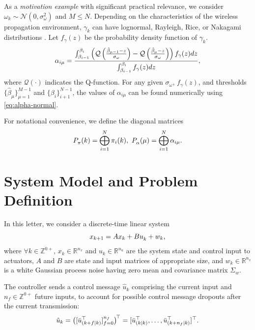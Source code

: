\documentclass[journal,twoside,web]{ieeecolor}
\begin{document}
As a \emph{motivation example} with significant practical relevance, we consider $\omega_k \sim \mathcal{N}(0,\sigma_{\omega}^2)$ and $M\leq N$. 
Depending on the characteristics of the wireless propagation environment, $\gamma_k$ can have lognormal, Rayleigh, Rice, or Nakagami distributions \cite{stuber2017principles}. 
Let $f_{\gamma}(z)$ be the probability density function of $\gamma_k$.
\begin{equation}\label{eq:alpha-normal}
    \text{\small $\alpha_{i\mu} = \frac{
    \int_{\beta_{i-1}}^{\beta_{i}}\left(
    \mathcal{Q}\left(\frac{\hat{\beta}_{\mu-1}-z}{\sigma_{\omega}}\right) - 
    \mathcal{Q}\left(\frac{\hat{\beta}_{\mu}-z}{\sigma_{\omega}}\right) 
    \right) f_{\gamma}(z)dz}{
    \int_{\beta_{i-1}}^{\beta_{i}} f_{\gamma}(z)dz},$}
\end{equation}
where $\mathcal{Q}(\cdot)$ indicates the Q-function. For any given $\sigma_{\omega}$, $f_{\gamma}(z)$, and %
thresholds $\{\hat{\beta}_{\mu}\}_{\mu=1}^{M-1}$ and $\{\beta_{i}\}_{i+1}^{N-1}$, the values of $\alpha_{i\mu}$ can be found numerically using \eqref{eq:alpha-normal}.

For notational convenience, we define the diagonal matrices
\begin{equation}\label{eq:diag-prob}
     \text{\small $P_{\pi}^{}(k) = \bigoplus_{i=1}^{N} \pi_{i}(k),~P_{\alpha}^{}(\mu) = \bigoplus_{i=1}^{N} \alpha_{i\mu}.$}
\end{equation}

\section{System Model and Problem Definition}\label{sec:model}
In this letter, we consider a discrete-time linear system %
\begin{equation}\label{eq:state}
        \text{\small $x_{k+1} = A x_{k} + B u_{k}^{} + w_{k},$}
\end{equation}
where $\forall k \!\in\! \mathbb{Z}^{0+}$, $x_k\!\in\!\mathbb{R}^{n_x}$ and $u_k^{}\!\in\!\mathbb{R}^{n_u}$ are the system state and control input to actuators, $A$ and $B$ are state and input matrices of appropriate size, and $w_k\!\in\!\mathbb{R}^{n_x}$ is a white Gaussian process noise having zero mean and covariance matrix $\Sigma_w$.

The controller sends a control message $\hat{u}_k$ comprising the current input and $n_{f}\in\mathbb{Z}^{0+}$ future inputs, to account for possible control message dropouts after the current transmission: 
\begin{equation}\label{eq:control-message}
    \text{\small $\hat{u}_k =
    \big([\bar{u}_{(k+f\mid k)}^{\top}]_{f=0}^{n_f}\big)^{\!\top} = 
    [\bar{u}_{(k\mid k)}^{\top},\dots,\bar{u}_{(k+n_f\mid k)}^{\top}]^{\top}.$}
\end{equation}
\end{document}
